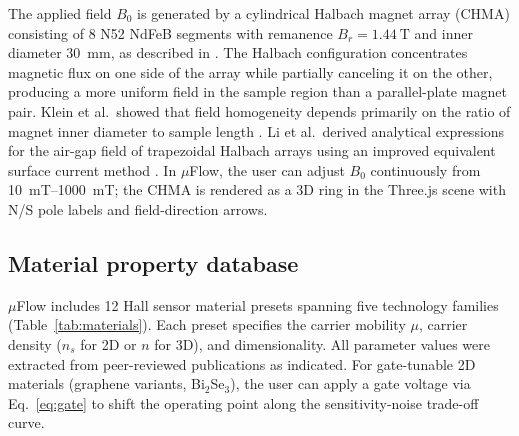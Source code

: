 \documentclass[preprint,review,12pt]{elsarticle}
\begin{document}
The applied field $B_0$ is generated by a cylindrical Halbach magnet array (CHMA) consisting of 8 N52 NdFeB segments with remanence $B_r = \SI{1.44}{\tesla}$ and inner diameter \SI{30}{\milli\meter}, as described in \cite{govindaraju2025}. The Halbach configuration concentrates magnetic flux on one side of the array while partially canceling it on the other, producing a more uniform field in the sample region than a parallel-plate magnet pair. Klein et al.\ showed that field homogeneity depends primarily on the ratio of magnet inner diameter to sample length \cite{klein2021}. Li et al.\ derived analytical expressions for the air-gap field of trapezoidal Halbach arrays using an improved equivalent surface current method \cite{li2023halbach}. In $\mu$Flow, the user can adjust $B_0$ continuously from \SIrange{10}{1000}{\milli\tesla}; the CHMA is rendered as a 3D ring in the Three.js scene with N/S pole labels and field-direction arrows.

\subsection{Material property database}
\label{sec:materials}

$\mu$Flow includes 12 Hall sensor material presets spanning five technology families (Table~\ref{tab:materials}). Each preset specifies the carrier mobility $\mu$, carrier density ($n_s$ for 2D or $n$ for 3D), and dimensionality. All parameter values were extracted from peer-reviewed publications as indicated. For gate-tunable 2D materials (graphene variants, Bi$_2$Se$_3$), the user can apply a gate voltage via Eq.~\eqref{eq:gate} to shift the operating point along the sensitivity-noise trade-off curve.
\end{document}

